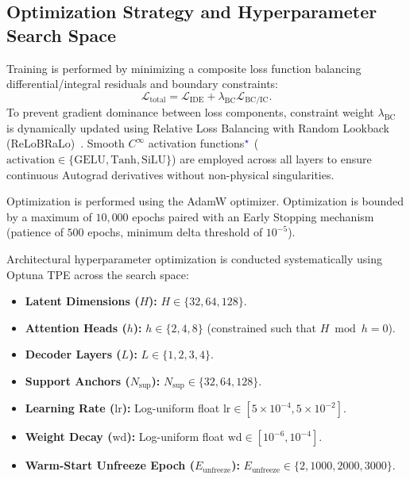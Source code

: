\subsection{Optimization Strategy and Hyperparameter Search Space}
Training is performed by minimizing a composite loss function balancing differential/integral residuals and boundary constraints:
\begin{equation}
    \mathcal{L}_{\text{total}} = \mathcal{L}_{\text{IDE}} + \lambda_{\text{BC}} \mathcal{L}_{\text{BC/IC}}.
\end{equation}
To prevent gradient dominance between loss components, constraint weight $\lambda_{\text{BC}}$ is dynamically updated using Relative Loss Balancing with Random Lookback (ReLoBRaLo)~\cite{relobralo2021}. Smooth $C^\infty$ activation functions$^{\textcolor{blue}{\star}}$ ($\text{activation} \in \{\text{GELU}, \text{Tanh}, \text{SiLU}\}$) are employed across all layers to ensure continuous Autograd derivatives without non-physical singularities.

Optimization is performed using the AdamW optimizer. Optimization is bounded by a maximum of $10,000$ epochs paired with an Early Stopping mechanism (patience of $500$ epochs, minimum delta threshold of $10^{-5}$).

Architectural hyperparameter optimization is conducted systematically using Optuna TPE across the search space:
\begin{itemize}
    \item \textbf{Latent Dimensions ($H$):} $H \in \{32, 64, 128\}$.
    \item \textbf{Attention Heads ($h$):} $h \in \{2, 4, 8\}$ (constrained such that $H \bmod h = 0$).
    \item \textbf{Decoder Layers ($L$):} $L \in \{1, 2, 3, 4\}$.
    \item \textbf{Support Anchors ($N_{\text{sup}}$):} $N_{\text{sup}} \in \{32, 64, 128\}$.
    \item \textbf{Learning Rate ($\text{lr}$):} Log-uniform float $\text{lr} \in [5 \times 10^{-4}, 5 \times 10^{-2}]$.
    \item \textbf{Weight Decay ($\text{wd}$):} Log-uniform float $\text{wd} \in [10^{-6}, 10^{-4}]$.
    \item \textbf{Warm-Start Unfreeze Epoch ($E_{\text{unfreeze}}$):} $E_{\text{unfreeze}} \in \{2, 1000, 2000, 3000\}$.
\end{itemize}